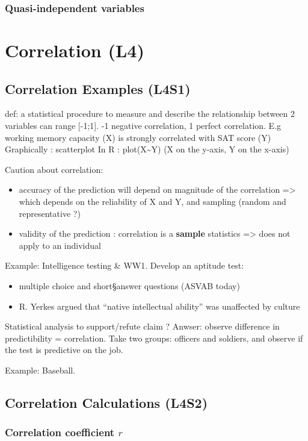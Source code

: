 \documentclass[11pt]{article}
\begin{document}
\subsubsection{Quasi-independent variables}
\label{sec-1-2-2}
\section{Correlation (L4)}
\label{sec-2}
\subsection{Correlation Examples (L4S1)}
\label{sec-2-1}

   def: a statistical procedure to measure and describe the relationship between 2 variables
   can range [-1;1]. -1 negative correlation, 1 perfect correlation. 
   E.g working memory capacity (X) is strongly correlated with SAT score (Y)
   Graphically : scatterplot
   In R : plot(X\~{}Y) (X on the y-axis, Y on the x-axis)

   Caution about correlation: 
\begin{itemize}
\item accuracy of the prediction will depend on
     magnitude of the correlation => which depends on the reliability of X and Y, and sampling (random and representative ?)
\item validity of the prediction : correlation is a \textbf{sample} statistics => does not apply to an individual
\end{itemize}

   Example: Intelligence testing \& WW1. Develop an aptitude test:
\begin{itemize}
\item multiple choice and short§answer questions (ASVAB today)
\item R. Yerkes argued that ``native intellectual ability'' was unaffected by culture
\end{itemize}
   Statistical analysis to support/refute claim ?
   Anwser: observe difference in predictibility = correlation.
           Take two groups: officers and soldiers, and observe if the test is predictive on the job.

   Example: Baseball. 
\subsection{Correlation Calculations (L4S2)}
\label{sec-2-2}
\subsubsection{Correlation coefficient $r$}
\label{sec-2-2-1}
\end{document}
